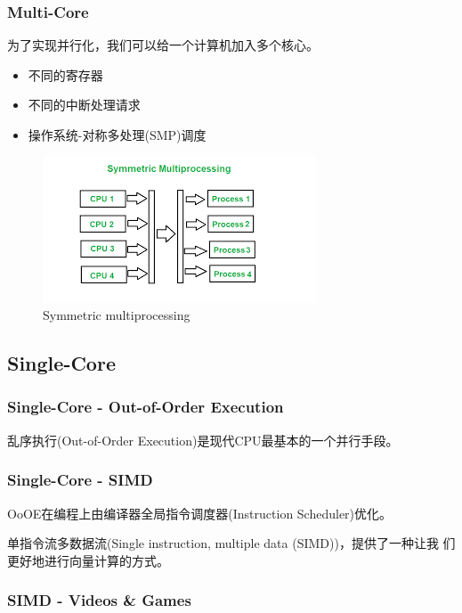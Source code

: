 \documentclass[aspectratio=169]{ctexbeamer}
\begin{document}
\begin{frame}
    \frametitle{Multi-Core}

    为了实现并行化，我们可以给一个计算机加入多个核心。

    \begin{itemize}
        \item 不同的寄存器
        \item 不同的中断处理请求
        \item 操作系统-对称多处理(SMP)调度
    \end{itemize}

    \begin{figure}[h]
        \includegraphics[height=0.45\textheight]{images/smp.png}
        \caption{Symmetric multiprocessing}
    \end{figure}

\end{frame}

\subsection{Single-Core}

\begin{frame}
    \frametitle{Single-Core - Out-of-Order Execution}

    乱序执行(Out-of-Order Execution)是现代CPU最基本的一个并行手段。


\end{frame}

\begin{frame}
    \frametitle{Single-Core - SIMD}

    OoOE在编程上由编译器全局指令调度器(Instruction Scheduler)优化。

    单指令流多数据流(Single instruction, multiple data (SIMD))，提供了一种让我
    们更好地进行向量计算的方式。


\end{frame}

\begin{frame}
    \frametitle{SIMD - Videos \& Games}


\end{frame}
\end{document}
